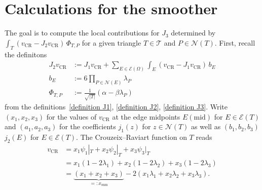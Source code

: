 \documentclass[11pt,a4paper]{article}
\newcommand{\vCR}{v_{\mathrm{CR}}}
\begin{document}
\section{Calculations for the smoother}
\label{calculations J3}
The goal is to compute the local contributions for \(J_3\) determined by \(\int_T (v_{\mathrm{CR}} - J_2 v_{\mathrm{CR}})\,\Phi_{T,P}\) for a given triangle \(T \in \mathcal{T}\) and \(P \in \mathcal{N}(T)\).
First, recall the definitons 
\begin{align*}
    J_2 v_{\mathrm{CR}} &:= J_1 v_{\mathrm{CR}} + \sum_{E \in \mathcal{E}(\Omega)}
     \int_E (v_{\mathrm{CR}} - J_1 v_{\mathrm{CR}})\, b_E \\
    b_E &:= 6 \prod_{P \in \mathcal{N}(E)} \lambda_P \\
    \Phi_{T,P} &:= \frac{1}{\sqrt{|T|}}(\alpha - \beta \lambda_P)
\end{align*}
from the definitions~\eqref{definition J1}, \eqref{definition J2}, \eqref{definition J3}. Write \((x_1,x_2,x_3)\) for the values of \(\vCR\) at the edge midpoints \(E(\mathrm{mid})\) for \(E \in \mathcal{E}(T)\) and \((a_1,a_2,a_3)\) for the coefficients \(j_1(z)\) for \(z \in \mathcal{N}(T)\) as well as \((b_1,b_2,b_3)\) \(j_2(E)\) for \(E \in \mathcal{E}(T)\).
The Crouzeix–Raviart function on \(T\) reads
\begin{align*}
v_{\mathrm{CR}}
&= x_1 \psi_1|_T + x_2 \psi_2|_T + x_3 \psi_3|_T \\
&= x_1(1 - 2\lambda_1)
  + x_2(1 - 2\lambda_2)
  + x_3(1 - 2\lambda_3) \\
&= \underbrace{(x_1 + x_2 + x_3)}_{=: x_{\mathrm{sum}}}
   - 2(x_1\lambda_1 + x_2\lambda_2 + x_3\lambda_3).
\end{align*}
\end{document}
